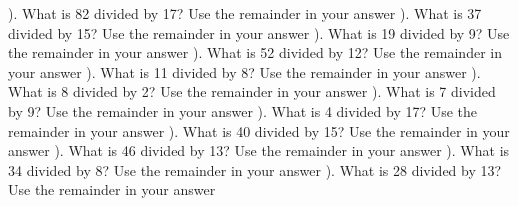 \documentclass{article}%
\begin{document}
). What is 82 divided by 17? Use the remainder in your answer%
\newline%
\newline%
). What is 37 divided by 15? Use the remainder in your answer%
\newline%
\newline%
). What is 19 divided by 9? Use the remainder in your answer%
\newline%
\newline%
). What is 52 divided by 12? Use the remainder in your answer%
\newline%
\newline%
). What is 11 divided by 8? Use the remainder in your answer%
\newline%
\newline%
). What is 8 divided by 2? Use the remainder in your answer%
\newline%
\newline%
). What is 7 divided by 9? Use the remainder in your answer%
\newline%
\newline%
). What is 4 divided by 17? Use the remainder in your answer%
\newline%
\newline%
). What is 40 divided by 15? Use the remainder in your answer%
\newline%
\newline%
). What is 46 divided by 13? Use the remainder in your answer%
\newline%
\newline%
). What is 34 divided by 8? Use the remainder in your answer%
\newline%
\newline%
). What is 28 divided by 13? Use the remainder in your answer%
\newline%
\newline%
\newline%
\end{document}
